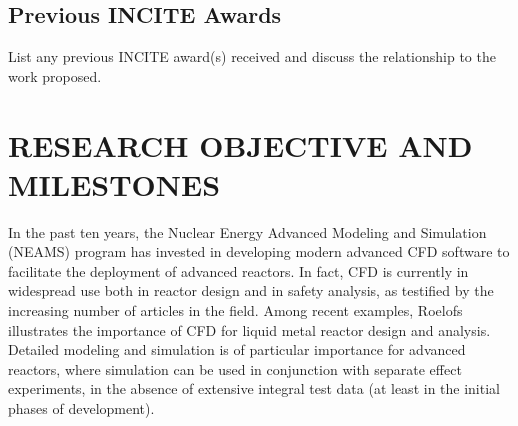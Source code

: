 \documentclass[11pt,letterpaper,english]{article}
\begin{document}

\vspace{-.25in}
\subsection{Previous INCITE Awards}
\vspace{-.2in}


List any previous INCITE award(s) received and discuss the relationship to the work proposed. 

\vspace{-.25in}
\section{RESEARCH OBJECTIVE AND MILESTONES} %
\vspace{-.2in}


In the past ten years, the Nuclear Energy Advanced Modeling and Simulation (NEAMS) program \cite{sofu2017us} has invested in developing modern advanced CFD software to facilitate the deployment of advanced reactors. In fact, CFD is currently in widespread use both in reactor design and in safety analysis, as testified by the increasing number of articles in the field. Among recent examples, Roelofs \cite{roelofs2018thermal} illustrates the importance of CFD for liquid metal reactor design and analysis. Detailed modeling and simulation is of particular importance for advanced reactors, where simulation can be used in conjunction with separate effect experiments, in the absence of extensive integral test data (at least in the initial phases of development).
\end{document}
